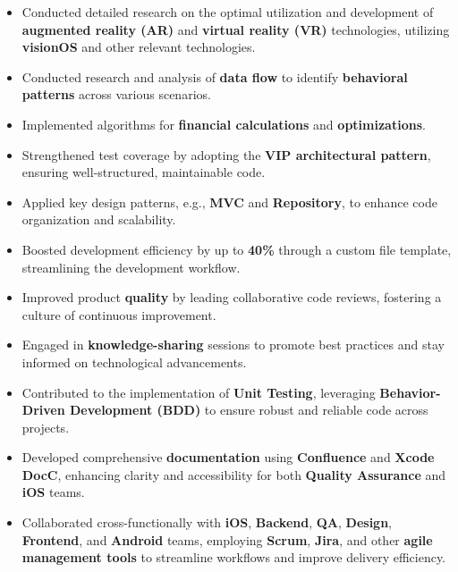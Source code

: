 \documentclass[letter,10pt]{article}
\newcommand{\customsquare}{\raisebox{0.25ex}{\scalebox{0.45}{$\blacksquare$}}}
\begin{document}
\begin{itemize}[label={\customsquare}]
    \item Conducted detailed research on the optimal utilization and development of \textbf{augmented reality (AR)} and \textbf{virtual reality (VR)} technologies, utilizing \textbf{visionOS} and other relevant technologies.
    \item Conducted research and analysis of \textbf{data flow} to identify \textbf{behavioral patterns} across various scenarios.
    \item Implemented algorithms for \textbf{financial calculations} and \textbf{optimizations}.
    \item Strengthened test coverage by adopting the \textbf{VIP architectural pattern}, ensuring well-structured, maintainable code.
    \item Applied key design patterns, e.g., \textbf{MVC} and \textbf{Repository}, to enhance code organization and scalability.
    \item Boosted development efficiency by up to \textbf{40\%} through a custom file template, streamlining the development workflow.
    \item Improved product \textbf{quality} by leading collaborative code reviews, fostering a culture of continuous improvement.
    \item Engaged in \textbf{knowledge-sharing} sessions to promote best practices and stay informed on technological advancements.
    \item Contributed to the implementation of \textbf{Unit Testing}, leveraging \textbf{Behavior-Driven Development (BDD)} to ensure robust and reliable code across projects.
    \item Developed comprehensive \textbf{documentation} using \textbf{Confluence} and \textbf{Xcode DocC}, enhancing clarity and accessibility for both \textbf{Quality Assurance} and \textbf{iOS} teams.
    \item Collaborated cross-functionally with \textbf{iOS}, \textbf{Backend}, \textbf{QA}, \textbf{Design}, \textbf{Frontend}, and \textbf{Android} teams, employing \textbf{Scrum}, \textbf{Jira}, and other \textbf{agile management tools} to streamline workflows and improve delivery efficiency.
\end{itemize}


\end{document}
